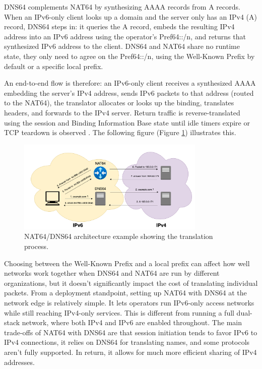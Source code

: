 DNS64 complements NAT64 by synthesizing AAAA records from A records. When an IPv6-only client looks up a domain and the server only has an IPv4 (A) record, DNS64 steps in: it queries the A record, embeds the resulting IPv4 address into an IPv6 address using the operator’s Pref64::/n, and returns that synthesized IPv6 address to the client\cite{rfc6147}. DNS64 and NAT64 share no runtime state, they only need to agree on the Pref64::/n, using the Well-Known Prefix by default or a specific local prefix\cite{6231295}. 

An end-to-end flow is therefore: an IPv6-only client receives a synthesized AAAA embedding the server’s IPv4 address, sends IPv6 packets to that address (routed to the NAT64), the translator allocates or looks up the binding, translates headers, and forwards to the IPv4 server. Return traffic is reverse-translated using the session and Binding Information Base state until idle timers expire or TCP teardown is observed \cite{6231295,rfc6147}. 
The following figure (Figure \ref{fig:nat64_dns64_architecture}) illustrates this.

\begin{figure}[H]
    \centering
    \caption{NAT64/DNS64 architecture example showing the translation process.}
    \label{fig:nat64_dns64_architecture}
    \includegraphics[width=0.8\textwidth]{resources/images/nat64diagram}
\end{figure}

Choosing between the Well-Known Prefix and a local prefix can affect how well networks work together when DNS64 and NAT64 are run by different organizations, but it doesn't significantly impact the cost of translating individual packets\cite{6231295}. From a deployment standpoint, setting up NAT64 with DNS64 at the network edge is relatively simple. It lets operators run IPv6-only access networks while still reaching IPv4-only services. This is different from running a full dual-stack network, where both IPv4 and IPv6 are enabled throughout. The main trade-offs of NAT64 with DNS64 are that session initiation tends to favor IPv6 to IPv4 connections, it relies on DNS64 for translating names, and some protocols aren’t fully supported. In return, it allows for much more efficient sharing of IPv4 addresses\cite{rfc6146}.

